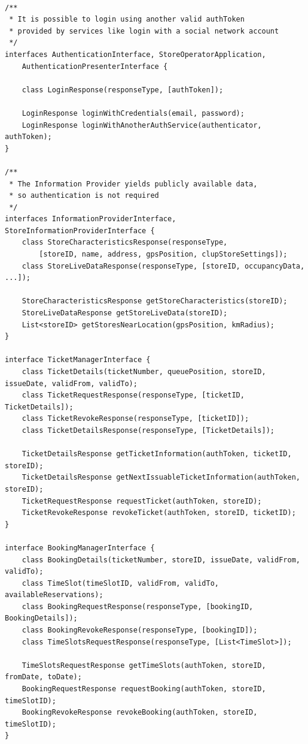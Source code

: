 \begin{lstlisting}

/**
 * It is possible to login using another valid authToken 
 * provided by services like login with a social network account 
 */
interfaces AuthenticationInterface, StoreOperatorApplication, 
    AuthenticationPresenterInterface {
                
    class LoginResponse(responseType, [authToken]);

    LoginResponse loginWithCredentials(email, password);
    LoginResponse loginWithAnotherAuthService(authenticator, authToken);
}

/**
 * The Information Provider yields publicly available data, 
 * so authentication is not required
 */
interfaces InformationProviderInterface, StoreInformationProviderInterface {
    class StoreCharacteristicsResponse(responseType, 
        [storeID, name, address, gpsPosition, clupStoreSettings]);
    class StoreLiveDataResponse(responseType, [storeID, occupancyData, ...]);

    StoreCharacteristicsResponse getStoreCharacteristics(storeID);
    StoreLiveDataResponse getStoreLiveData(storeID);
    List<storeID> getStoresNearLocation(gpsPosition, kmRadius);
}

interface TicketManagerInterface {
    class TicketDetails(ticketNumber, queuePosition, storeID, issueDate, validFrom, validTo);
    class TicketRequestResponse(responseType, [ticketID, TicketDetails]);
    class TicketRevokeResponse(responseType, [ticketID]);
    class TicketDetailsResponse(responseType, [TicketDetails]);

    TicketDetailsResponse getTicketInformation(authToken, ticketID, storeID);
    TicketDetailsResponse getNextIssuableTicketInformation(authToken, storeID);
    TicketRequestResponse requestTicket(authToken, storeID);
    TicketRevokeResponse revokeTicket(authToken, storeID, ticketID);
}

interface BookingManagerInterface {
    class BookingDetails(ticketNumber, storeID, issueDate, validFrom, validTo);
    class TimeSlot(timeSlotID, validFrom, validTo, availableReservations);
    class BookingRequestResponse(responseType, [bookingID, BookingDetails]);
    class BookingRevokeResponse(responseType, [bookingID]);
    class TimeSlotsRequestResponse(responseType, [List<TimeSlot>]);

    TimeSlotsRequestResponse getTimeSlots(authToken, storeID, fromDate, toDate);
    BookingRequestResponse requestBooking(authToken, storeID, timeSlotID);
    BookingRevokeResponse revokeBooking(authToken, storeID, timeSlotID);
}


\end{lstlisting}
